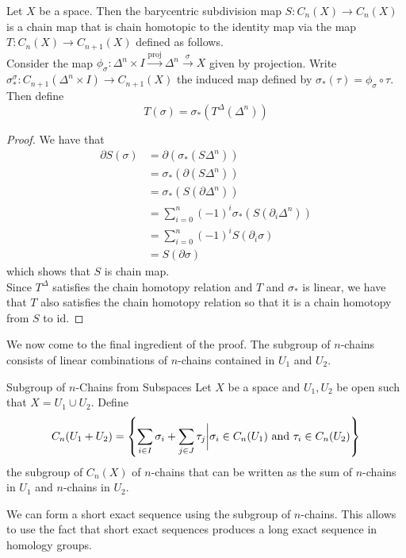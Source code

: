 \documentclass[a4paper]{article}
\begin{document}
\begin{prp}{}{} Let $X$ be a space. Then the barycentric subdivision map $S:C_n(X)\to C_n(X)$ is a chain map that is chain homotopic to the identity map via the map $T:C_n(X)\to C_{n+1}(X)$ defined as follows. \\

Consider the map $\phi_\sigma:\Delta^n\times I\overset{\text{proj}}{\rightarrow}\Delta^n\overset{\sigma}{\rightarrow}X$ given by projection. Write $\sigma_\ast^\sigma:C_{n+1}(\Delta^n\times I)\to C_{n+1}(X)$ the induced map defined by $\sigma_\ast(\tau)=\phi_\sigma\circ\tau$. Then define $$T(\sigma)=\sigma_\ast(T^\Delta(\Delta^n))$$  
\begin{proof}
We have that 
\begin{align*}
\partial S(\sigma)&=\partial(\sigma_\ast(S\Delta^n))\\
&=\sigma_\ast(\partial(S\Delta^n))\tag{$\sigma_\ast$ is a chain map}\\
&=\sigma_\ast(S(\partial\Delta^n))\tag{Lemma 4.2.4}\\
&=\sum_{i=0}^n(-1)^i\sigma_\ast(S(\partial_i\Delta^n))\\
&=\sum_{i=0}^n(-1)^iS(\partial_i\sigma)\tag{Definition of $S$}\\
&=S(\partial\sigma)
\end{align*}
which shows that $S$ is chain map. \\

Since $T^\Delta$ satisfies the chain homotopy relation and $T$ and $\sigma_\ast$ is linear, we have that $T$ also satisfies the chain homotopy relation so that it is a chain homotopy from $S$ to $\text{id}$. 
\end{proof}
\end{prp}

We now come to the final ingredient of the proof. The subgroup of $n$-chains consists of linear combinations of $n$-chains contained in $U_1$ and $U_2$. 

\begin{defn}{Subgroup of $n$-Chains from Subspaces}{} Let $X$ be a space and $U_1,U_2$ be open such that $X=U_1\cup U_2$. Define $$C_n(U_1+U_2)=\left\{\sum_{i\in I}\sigma_i+\sum_{j\in J}\tau_j\bigg{|}\sigma_i\in C_n(U_1)\text{ and }\tau_i\in C_n(U_2)\right\}$$ the subgroup of $C_n(X)$ of $n$-chains that can be written as the sum of $n$-chains in $U_1$ and $n$-chains in $U_2$. 
\end{defn}

We can form a short exact sequence using the subgroup of $n$-chains. This allows to use the fact that short exact sequences produces a long exact sequence in homology groups. 
\end{document}
